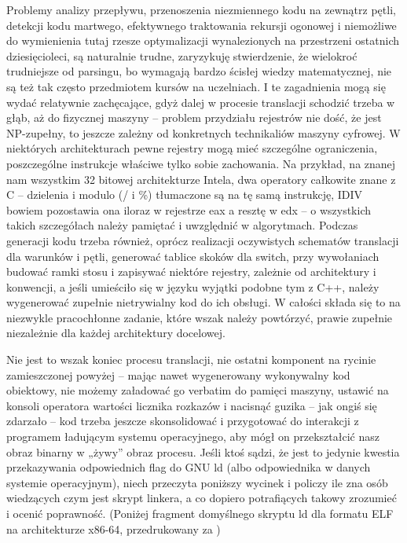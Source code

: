 Problemy analizy przepływu, przenoszenia niezmiennego kodu na zewnątrz pętli, detekcji kodu martwego, efektywnego traktowania rekursji ogonowej i niemożliwe do wymienienia tutaj rzesze optymalizacji wynalezionych na przestrzeni ostatnich dziesięcioleci, są naturalnie trudne, zaryzykuję stwierdzenie, że wielokroć trudniejsze od parsingu, bo wymagają bardzo ścisłej wiedzy matematycznej, nie są też tak często przedmiotem kursów na uczelniach. I te zagadnienia mogą się wydać relatywnie zachęcające, gdyż dalej w procesie translacji schodzić trzeba w głąb, aż do fizycznej maszyny – problem przydziału rejestrów nie dość, że jest NP-zupełny\cite{REGISTER_ALLOCATION_CHAITIN1981}\cite{REGISTER_ALLOCATION_2}, to jeszcze zależny od konkretnych technikaliów maszyny cyfrowej. W niektórych architekturach pewne rejestry mogą mieć szczególne ograniczenia, poszczególne instrukcje właściwe tylko sobie zachowania. Na przykład, na znanej nam wszystkim 32 bitowej architekturze Intela, dwa operatory całkowite znane z C – dzielenia i modulo (/ i \%) tłumaczone są na tę samą instrukcję, IDIV bowiem pozostawia ona iloraz w rejestrze eax a resztę w edx – o wszystkich takich szczegółach należy pamiętać i uwzględnić w algorytmach. Podczas generacji kodu trzeba również, oprócz realizacji oczywistych schematów translacji dla warunków i pętli, generować tablice skoków dla switch, przy wywołaniach budować ramki stosu i zapisywać niektóre rejestry, zależnie od architektury i konwencji, a jeśli umieściło się w języku wyjątki podobne tym z C++, należy wygenerować zupełnie nietrywialny kod do ich obsługi. W całości składa się to na niezwykle pracochłonne zadanie, które wszak należy powtórzyć, prawie zupełnie niezależnie dla każdej architektury docelowej.

Nie jest to wszak koniec procesu translacji, nie ostatni komponent na rycinie zamieszczonej powyżej – mając nawet wygenerowany wykonywalny kod obiektowy, nie możemy załadować go verbatim do pamięci maszyny, ustawić na konsoli operatora wartości licznika rozkazów i nacisnąć guzika – jak ongiś się zdarzało – kod trzeba jeszcze skonsolidować i przygotować do interakcji z programem ładującym systemu operacyjnego, aby mógł on przekształcić nasz obraz binarny w „żywy” obraz procesu. Jeśli ktoś sądzi, że jest to jedynie kwestia przekazywania odpowiednich flag do GNU ld (albo odpowiednika w danych systemie operacyjnym), niech przeczyta poniższy wycinek i policzy ile zna osób wiedzących czym jest skrypt linkera, a co dopiero potrafiących takowy zrozumieć i ocenić poprawność.
(Poniżej fragment domyślnego skryptu ld dla formatu ELF na architekturze x86-64, przedrukowany za \cite{default_ld_linker_script})

